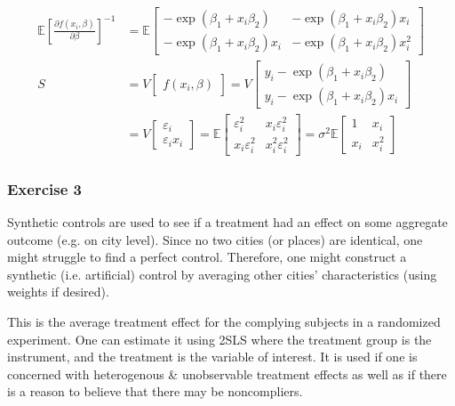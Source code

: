 {{\begin{enumerate}[label=(\arabic*)]
{$$
\begin{aligned}
\mathbb{E}\left[\frac{\partial f\left(x_{i}, \beta\right)}{\partial \beta}\right]^{-1} & =\mathbb{E}\left[\begin{array}{ll}
-\exp \left(\beta_{1}+x_{i} \beta_{2}\right) & -\exp \left(\beta_{1}+x_{i} \beta_{2}\right) x_{i} \\
-\exp \left(\beta_{1}+x_{i} \beta_{2}\right) x_{i} & -\exp \left(\beta_{1}+x_{i} \beta_{2}\right) x_{i}^{2}
\end{array}\right] \\
S & =V\left[\begin{array}{ll}
f\left(x_{i}, \beta\right)
\end{array}\right]=V\left[\begin{array}{ll}
y_{i}-\exp \left(\beta_{1}+x_{i} \beta_{2}\right) \\
y_{i}-\exp \left(\beta_{1}+x_{i} \beta_{2}\right) x_{i}
\end{array}\right] \\
& =V\left[\begin{array}{cc}
\varepsilon_{i} \\
\varepsilon_{i} x_{i}
\end{array}\right]=\mathbb{E}\left[\begin{array}{cc}
\varepsilon_{i}^{2} & x_{i} \varepsilon_{i}^{2} \\
x_{i} \varepsilon_{i}^{2} & x_{i}^{2} \varepsilon_{i}^{2}
\end{array}\right]=\sigma^{2} \mathbb{E}\left[\begin{array}{cc}
1 & x_{i} \\
x_{i} & x_{i}^{2}
\end{array}\right]
\end{aligned}
$$
}
\end{enumerate}
}
{
\subsubsection*{Exercise 3}

\begin{enumerate}[label=(\arabic*)]
{\item 
Synthetic controls are used to see if a treatment had an effect on some aggregate outcome (e.g. on city level). Since no two cities (or places) are identical, one might struggle to find a perfect control. Therefore, one might construct a synthetic (i.e. artificial) control by averaging other cities' characteristics (using weights if desired).
}
{\item 
This is the average treatment effect for the complying subjects in a randomized experiment. One can estimate it using 2SLS where the treatment group is the instrument, and the treatment is the variable of interest. It is used if one is concerned with heterogenous \& unobservable treatment effects as well as if there is a reason to believe that there may be noncompliers.
}
\end{enumerate}
}
{
}}
